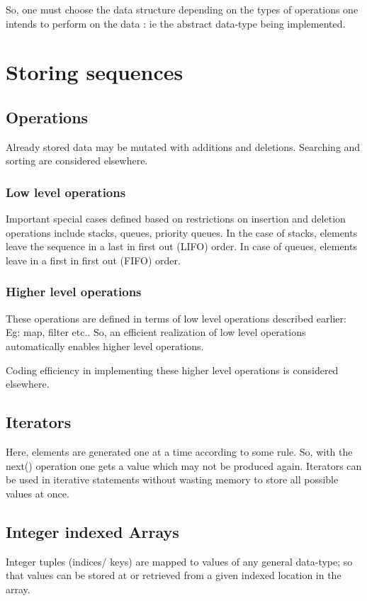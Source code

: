 \documentclass[oneside, article]{memoir}
\begin{document}
So, one must choose the data structure depending on the types of operations one intends to perform on the data : ie the abstract data-type being implemented.

\chapter{Storing sequences}
\section{Operations}
Already stored data may be mutated with additions and deletions. Searching and sorting are considered elsewhere.

\subsection{Low level operations}
Important special cases defined based on restrictions on insertion and deletion operations include stacks, queues, priority queues. In the case of stacks, elements leave the sequence in a last in first out (LIFO) order. In case of queues, elements leave in a first in first out (FIFO) order.

\subsection{Higher level operations}
These operations are defined in terms of low level operations described earlier: Eg: map, filter etc.. So, an efficient realization of low level operations automatically enables higher level operations.

Coding efficiency in implementing these higher level operations is considered elsewhere.

\section{Iterators}
Here, elements are generated one at a time according to some rule. So, with the next() operation one gets a value which may not be produced again. Iterators can be used in iterative statements without wasting memory to store all possible values at once.

\section{Integer indexed Arrays}
Integer tuples (indices/ keys) are mapped to values of any general data-type; so that values can be stored at or retrieved from a given indexed location in the array.
\end{document}
